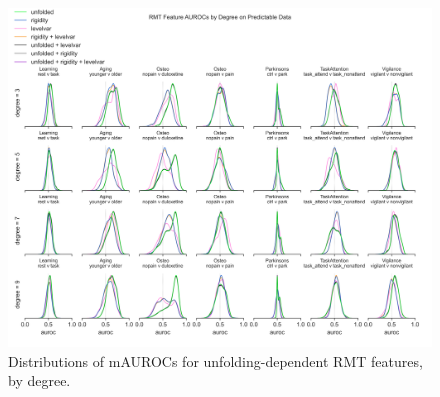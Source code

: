 \documentclass{article}  %
\begin{document}
\begin{spacing}{1}
\begin{figure}
\begin{center}
\includegraphics[width=\textwidth,height=0.9\textheight,keepaspectratio]{rmt_feature_auroc_by_degree.png}
\end{center}
\caption
{ \label{fig:fine-degree}
Distributions of mAUROCs for unfolding-dependent RMT features, by degree.}
\end{figure}








\end{spacing}
\end{document}
